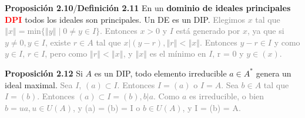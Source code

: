\documentclass[a4paper, 11pt]{extarticle}
\newcommand{\propo}[1]{\textcolor{rojo}{\textbf{Proposición #1}}}
\newcommand{\defi}[1]{\textcolor{azul}{\textbf{Definición #1}}}
\begin{document}
\propo{2.10}/\defi{2.11} En un \textbf{dominio de ideales principales \textcolor{red}{DPI}}
todos los ideales son principales. Un DE es un DIP. 
\textcolor{gray}{\footnotesize Elegimos \( x \) tal que \( \left\Vert x \right\Vert = \text{min}\{ \left\Vert y \right\Vert  \;|\; 0 \neq y \in I  \} \). 
Entonces \( x > 0 \) y \( I  \) está generado por \( x \), ya que si \( y \neq 0, y \in I  \),
existe \( r \in A \) tal que \( x|(y-r), \left\Vert r \right\Vert < \left\Vert x \right\Vert  \). Entonces \( y-r \in I  \) y como \( y \in I  \),
\( r \in I \), pero como \( \left\Vert r \right\Vert < \left\Vert x \right\Vert  \), y \( \left\Vert x \right\Vert  \) es el mínimo en \( I  \), r = 0 y \( y \in (x) \).}

\propo{2.12} Si \(A\) es un DIP, todo elemento irreducible \(a \in A^*\)
genera un ideal maximal. 
\textcolor{gray}{\footnotesize Sea \( I  \), \( (a) \subset I  \). Entonces \( I = (a) \) o 
\( I = A \). Sea \( b \in A \) tal que \( I = (b) \). Entonces \( (a) \subset I = (b), b | a \). 
Como \( a \) es irreducible, o bien \( b = ua, u \in U(A) \), y (a) = (b) = I \) o \( b \in U(A) \), y I = (b) = A.}






\vspace{-1em}
\begin{center}
\end{center}
\vspace{-1em}
\end{document}
